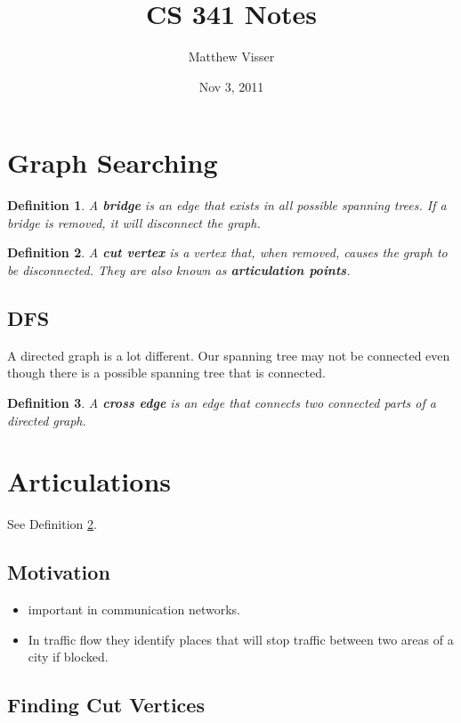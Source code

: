 \documentclass[12pt]{article}
\newtheorem{defn}{Definition}[section]
\numberwithin{equation}{section}
\begin{document}
\title{CS 341 Notes}
\author{Matthew Visser}
\date{Nov  3, 2011}
\maketitle

\section{Graph Searching}

\begin{defn}
	A \textbf{bridge} is an edge that exists in all possible spanning trees.
	If a bridge is removed, it will disconnect the graph.
\end{defn}

\begin{defn}
	A \textbf{cut vertex} is a vertex that, when removed, causes the graph to be
	disconnected.  They are also known as \textbf{articulation points}.
	\label{cut-vertex}
\end{defn}

\subsection{DFS}

A directed graph is a lot different.  Our spanning tree may not be connected
even though there is a possible spanning tree that is connected.

\begin{defn}
	A \textbf{cross edge} is an edge that connects two connected parts of a
	directed graph.
\end{defn}

\section{Articulations}

See Definition \ref{cut-vertex}.

\subsection{Motivation}
\begin{itemize}
	\item important in communication networks.
	\item In traffic flow they identify places that will stop traffic between
		two areas of a city if blocked.
\end{itemize}

\subsection{Finding Cut Vertices}
\end{document}
